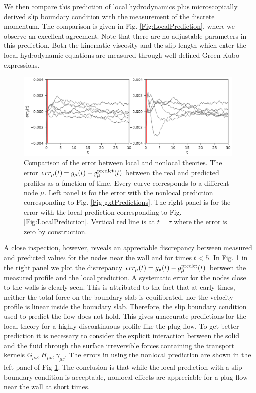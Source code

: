 \documentclass[b5paper,openright,10pt]{book}
\begin{document}
We  then   compare  this   prediction  of  local   hydrodynamics  plus
microscopically derived  slip boundary condition with  the measurement
of  the   discrete  momentum.   The   comparison  is  given   in  Fig.
\ref{Fig:LocalPrediction},  where we  observe  an excellent  agreement.
Note that there are no  adjustable parameters in this prediction. Both
the kinematic viscosity and the slip  length which enter the local hydrodynamic equations are
measured through well-defined Green-Kubo  expressions. 

\begin{figure}[]
\includegraphics[width=\linewidth]{errors-17nodes-WALLS}
  \caption[Comparison of the error between local and nonlocal theories]{Comparison  of   the  error   between  local   and  nonlocal
  theories.  The error  $err_\mu(t)= g_\mu(t)-g^{\rm  predict}_\mu(t)$
  between the real and predicted profiles as a function of time. Every
  curve corresponds to  a different node $\mu$.  
  Left panel  is for the error with
  the     nonlocal      prediction     corresponding      to     Fig.
  \ref{Fig-gxtPredictions}.
  The right  panel is for
  the   error    with   the   local   prediction    corresponding   to
  Fig. \ref{Fig:LocalPrediction}. 
  Vertical red  line is at $t=\tau$  where the error
  is zero by construction.}
\label{Fig:err}
\end{figure}

A  close  inspection,  however,  reveals  an  appreciable
discrepancy between measured  and predicted values for  the nodes near
the wall and for times $t<5$. In Fig. \ref{Fig:err} in the right panel
we plot the discrepancy $err_\mu(t)=  g_\mu(t)-g^{\rm predict}_\mu(t)$ between the
measured profile and the local prediction. A systematic error for the nodes
close to the walls is clearly seen.  This  is attributed to the fact that at
early times, neither the  total force  on the boundary  slab is
equilibrated, nor the  velocity profile is linear  inside the boundary
slab.  Therefore, the slip boundary condition used to predict the flow
does not hold.  This gives unaccurate predictions for the local theory
for a highly discontinuous profile like  the plug flow.  To get better
prediction  it  is  necessary  to consider  the  explicit  interaction
between  the solid  and  the fluid  through  the surface  irreversible
forces         containing         the        transport         kernels
$G_{\mu\nu},H_{\mu\nu},\gamma_{\mu\nu}$.  The errors in using the nonlocal prediction 
are shown in the left panel of Fig \ref{Fig:err}. The conclusion is that while the local prediction
with a slip boundary condition is acceptable, nonlocal effects are appreciable for a plug flow near the wall at short times.
\end{document}
